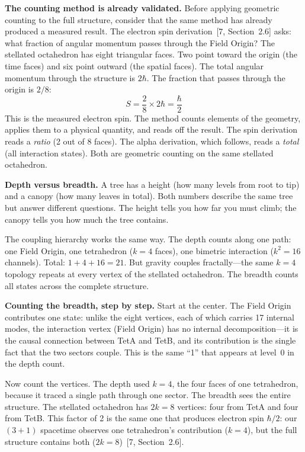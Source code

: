 \documentclass[11pt]{article}
\begin{document}
\textbf{The counting method is already validated.}\quad
Before applying geometric counting to the full structure, consider that the same method has already produced a measured result.
The electron spin derivation~[7, Section~2.6] asks: what fraction of angular momentum passes through the Field Origin?
The stellated octahedron has eight triangular faces.
Two point toward the origin (the time faces) and six point outward (the spatial faces).
The total angular momentum through the structure is $2\hbar$.
The fraction that passes through the origin is $2/8$:
\begin{equation*}
S = \frac{2}{8} \times 2\hbar = \frac{\hbar}{2}
\end{equation*}
This is the measured electron spin.
The method counts elements of the geometry, applies them to a physical quantity, and reads off the result.
The spin derivation reads a \emph{ratio} (2 out of 8 faces).
The alpha derivation, which follows, reads a \emph{total} (all interaction states).
Both are geometric counting on the same stellated octahedron.

\textbf{Depth versus breadth.}\quad
A tree has a height (how many levels from root to tip) and a canopy (how many leaves in total).
Both numbers describe the same tree but answer different questions.
The height tells you how far you must climb; the canopy tells you how much the tree contains.

The coupling hierarchy works the same way.
The depth counts along one path: one Field Origin, one tetrahedron ($k = 4$ faces), one bimetric interaction ($k^2 = 16$ channels).
Total: $1 + 4 + 16 = 21$.
But gravity couples fractally---the same $k = 4$ topology repeats at every vertex of the stellated octahedron.
The breadth counts all states across the complete structure.

\textbf{Counting the breadth, step by step.}\quad
Start at the center.
The Field Origin contributes one state: unlike the eight vertices, each of which carries 17 internal modes, the interaction vertex (Field Origin) has no internal decomposition---it is the causal connection between TetA and TetB, and its contribution is the single fact that the two sectors couple.
This is the same ``1'' that appears at level~0 in the depth count.

Now count the vertices.
The depth used $k = 4$, the four faces of one tetrahedron, because it traced a single path through one sector.
The breadth sees the entire structure.
The stellated octahedron has $2k = 8$ vertices: four from TetA and four from TetB.
This factor of 2 is the same one that produces electron spin $\hbar/2$: our $(3+1)$ spacetime observes one tetrahedron's contribution ($k = 4$), but the full structure contains both ($2k = 8$)~[7, Section~2.6].
\end{document}
